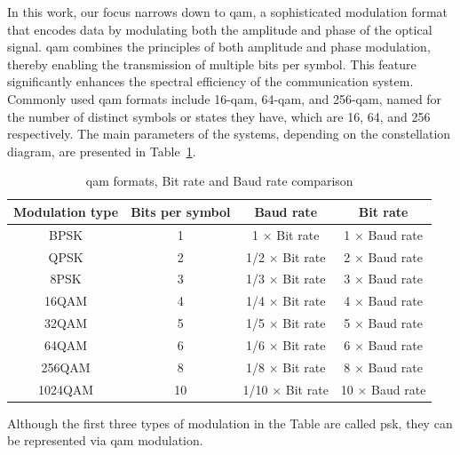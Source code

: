 In this work, our focus narrows down to \acrlong{qam}, a sophisticated modulation format that encodes data by modulating both the amplitude and phase of the optical signal. \acrshort{qam} combines the principles of both amplitude and phase modulation, thereby enabling the transmission of multiple bits per symbol. This feature significantly enhances the spectral efficiency of the communication system. Commonly used \acrshort{qam} formats include 16-\acrshort{qam}, 64-\acrshort{qam}, and 256-\acrshort{qam}, named for the number of distinct symbols or states they have, which are 16, 64, and 256 respectively. The main parameters of the systems, depending on the constellation diagram, are presented in Table~\ref{tab:modulation}.
\begin{table}[h]
    \caption{\acrshort{qam} formats, Bit rate and Baud rate comparison}
    \begin{center}
        \begin{tabular}{cccc}
            \hline
            Modulation type & Bits per symbol & Baud rate & Bit rate\\ 
            \hline
            BPSK & 1 & 1 $\times$ Bit rate & 1 $\times$ Baud rate \\
            QPSK & 2 & 1/2 $\times$ Bit rate & 2 $\times$ Baud rate \\
            8PSK & 3 & 1/3 $\times$ Bit rate & 3 $\times$ Baud rate \\
            16QAM & 4 & 1/4 $\times$ Bit rate & 4 $\times$ Baud rate \\
            32QAM & 5 & 1/5 $\times$ Bit rate & 5 $\times$ Baud rate \\
            64QAM & 6 & 1/6 $\times$ Bit rate & 6 $\times$ Baud rate \\
            256QAM & 8 & 1/8 $\times$ Bit rate & 8 $\times$ Baud rate \\
            1024QAM & 10 & 1/10 $\times$ Bit rate & 10 $\times$ Baud rate \\
            \hline
        \end{tabular}
    \label{tab:modulation}
    \end{center}
\end{table}
Although the first three types of modulation in the Table are called \acrfull{psk}, they can be represented via \acrshort{qam} modulation. 


